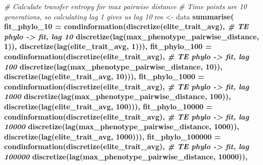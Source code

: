 \documentclass[]{book}
\newenvironment{Shaded}{\begin{snugshade}}{\end{snugshade}}
\newcommand{\CommentTok}[1]{\textcolor[rgb]{0.56,0.35,0.01}{\textit{#1}}}
\newcommand{\DataTypeTok}[1]{\textcolor[rgb]{0.13,0.29,0.53}{#1}}
\newcommand{\DecValTok}[1]{\textcolor[rgb]{0.00,0.00,0.81}{#1}}
\newcommand{\KeywordTok}[1]{\textcolor[rgb]{0.13,0.29,0.53}{\textbf{#1}}}
\newcommand{\NormalTok}[1]{#1}
\newcommand{\OperatorTok}[1]{\textcolor[rgb]{0.81,0.36,0.00}{\textbf{#1}}}
\newcommand{\StringTok}[1]{\textcolor[rgb]{0.31,0.60,0.02}{#1}}
\begin{document}
\begin{Shaded}
\begin{Highlighting}[]
\CommentTok{# Calculate transfer entropy for max pairwise distance}
\CommentTok{# Time points are 10 generations, so calculating lag 1 gives us lag 10}
\NormalTok{res <-}\StringTok{ }\NormalTok{data }\OperatorTok{%
\KeywordTok{summarise}\NormalTok{(}
  \DataTypeTok{fit_phylo_10 =}     \KeywordTok{condinformation}\NormalTok{(}\KeywordTok{discretize}\NormalTok{(elite_trait_avg), }\CommentTok{# TE phylo -> fit, lag 10}
                                     \KeywordTok{discretize}\NormalTok{(}\KeywordTok{lag}\NormalTok{(max_phenotype_pairwise_distance, }\DecValTok{1}\NormalTok{)), }
                                     \KeywordTok{discretize}\NormalTok{(}\KeywordTok{lag}\NormalTok{(elite_trait_avg, }\DecValTok{1}\NormalTok{))),}
  \DataTypeTok{fit_phylo_100 =}    \KeywordTok{condinformation}\NormalTok{(}\KeywordTok{discretize}\NormalTok{(elite_trait_avg), }\CommentTok{# TE phylo -> fit, lag 100}
                                     \KeywordTok{discretize}\NormalTok{(}\KeywordTok{lag}\NormalTok{(max_phenotype_pairwise_distance, }\DecValTok{10}\NormalTok{)), }
                                     \KeywordTok{discretize}\NormalTok{(}\KeywordTok{lag}\NormalTok{(elite_trait_avg, }\DecValTok{10}\NormalTok{))),}
  \DataTypeTok{fit_phylo_1000 =}   \KeywordTok{condinformation}\NormalTok{(}\KeywordTok{discretize}\NormalTok{(elite_trait_avg), }\CommentTok{# TE phylo -> fit, lag 1000}
                                     \KeywordTok{discretize}\NormalTok{(}\KeywordTok{lag}\NormalTok{(max_phenotype_pairwise_distance, }\DecValTok{100}\NormalTok{)), }
                                     \KeywordTok{discretize}\NormalTok{(}\KeywordTok{lag}\NormalTok{(elite_trait_avg, }\DecValTok{100}\NormalTok{))),}
  \DataTypeTok{fit_phylo_10000 =}  \KeywordTok{condinformation}\NormalTok{(}\KeywordTok{discretize}\NormalTok{(elite_trait_avg), }\CommentTok{# TE phylo -> fit, lag 10000}
                                     \KeywordTok{discretize}\NormalTok{(}\KeywordTok{lag}\NormalTok{(max_phenotype_pairwise_distance, }\DecValTok{1000}\NormalTok{)), }
                                     \KeywordTok{discretize}\NormalTok{(}\KeywordTok{lag}\NormalTok{(elite_trait_avg, }\DecValTok{1000}\NormalTok{))),}
  \DataTypeTok{fit_phylo_100000 =} \KeywordTok{condinformation}\NormalTok{(}\KeywordTok{discretize}\NormalTok{(elite_trait_avg), }\CommentTok{# TE phylo -> fit, lag 100000}
                                     \KeywordTok{discretize}\NormalTok{(}\KeywordTok{lag}\NormalTok{(max_phenotype_pairwise_distance, }\DecValTok{10000}\NormalTok{)), }
}
\end{Highlighting}
\end{Shaded}
\end{document}
